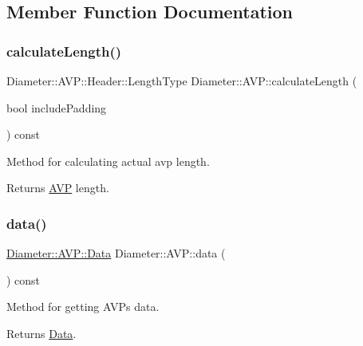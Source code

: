 \subsection{Member Function Documentation}
\mbox{\label{classDiameter_1_1AVP_a755fe56553f0a9649c60fab98672a384}} 
\subsubsection{\texorpdfstring{calculate\+Length()}{calculateLength()}}
{\footnotesize\ttfamily Diameter\+::\+A\+V\+P\+::\+Header\+::\+Length\+Type Diameter\+::\+A\+V\+P\+::calculate\+Length (\begin{DoxyParamCaption}\item[{bool}]{include\+Padding }\end{DoxyParamCaption}) const}



Method for calculating actual avp length. 

\begin{DoxyReturn}{Returns}
\hyperlink{classDiameter_1_1AVP}{A\+VP} length. 
\end{DoxyReturn}
\mbox{\label{classDiameter_1_1AVP_aac6b58b95eef96ad4e3320d52a1b4093}} 
\subsubsection{\texorpdfstring{data()}{data()}\hspace{0.1cm}{\footnotesize\ttfamily [1/2]}}
{\footnotesize\ttfamily \hyperlink{classDiameter_1_1AVP_1_1Data}{Diameter\+::\+A\+V\+P\+::\+Data} Diameter\+::\+A\+V\+P\+::data (\begin{DoxyParamCaption}{ }\end{DoxyParamCaption}) const}



Method for getting A\+V\+Ps data. 

\begin{DoxyReturn}{Returns}
\hyperlink{classDiameter_1_1AVP_1_1Data}{Data}. 
\end{DoxyReturn}
\mbox{\label{classDiameter_1_1AVP_a49f5fad4dbdf9ffe49c16d3d975df3c5}} 
